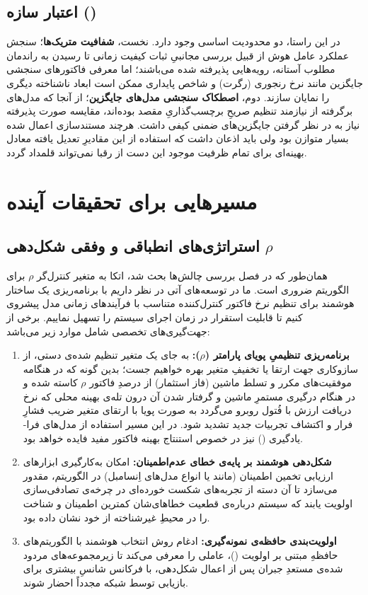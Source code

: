 \documentclass[oneside,openany,phd]{TMU-Thesis}
\begin{document}
\subsection{اعتبار سازه ()}

در این راستا، دو محدودیت اساسی وجود دارد. نخست، \textbf{شفافیت متریک‌ها}؛ سنجش عملکرد عامل هوش از قبیل بررسی مجانبیِ ثبات کیفیت زمانی تا رسیدن به راندمان مطلوب آستانه، رویه‌هایی پذیرفته شده می‌باشند؛ اما معرفی فاکتورهای سنجشی جایگزین مانند نرخ رنجوری (رگرت) و شاخص پایداری ممکن است ابعاد ناشناخته دیگری را نمایان سازند. دوم، \textbf{اصطکاک سنجشی مدل‌های جایگزین}؛ از آنجا که مدل‌های برگرفته از  نیازمند تنظیم صریحِ برچسب‌گذاریِ مقصد بوده‌اند، مقایسه صورت پذیرفته نیاز به در نظر گرفتن جایگزین‌های ضمنی کیفی داشت. هرچند مستندسازی اعمال شده بسیار متوازن بود ولی باید اذعان داشت که استفاده از این مقادیرِ تعدیل یافته معادل بهینه‌ای برای تمام ظرفیت موجود این دست از رقبا نمی‌تواند قلمداد گردد.

\section{مسیرهایی برای تحقیقات آینده}

\subsection{استراتژی‌های انطباقی و وفقی شکل‌دهی $\rho$}

همان‌طور که در فصل بررسی چالش‌ها بحث شد، اتکا به متغیر کنترل‌گر $\rho$ برای الگوریتم ضروری است. ما در توسعه‌های آتی در نظر داریم با برنامه‌ریزی یک ساختار هوشمند برای تنظیم نرخ فاکتور کنترل‌کننده متناسب با فرآیندهای زمانی مدل پیشروی کنیم تا قابلیت استقرار در زمان اجرای سیستم را تسهیل نماییم. برخی از جهت‌گیری‌های تخصصی شامل موارد زیر می‌باشد:
\begin{enumerate}
  \item \textbf{برنامه‌ریزی تنظیمیِ پویای پارامتر ($\rho$):} به جای یک متغیر تنظیم شده‌ی دستی، از سازوکاری جهت ارتقا یا تخفیفِ متغیر بهره خواهیم جست؛ بدین گونه که در هنگامه موفقیت‌های مکرر و تسلط ماشین (فاز استثمار) از درصدِ فاکتور $\rho$ کاسته شده و در هنگام درگیری مستمرِ ماشین و گرفتار شدن آن درون تله‌ی بهینه محلی که نرخ دریافت ارزش با فُتول روبرو می‌گردد به صورت پویا با ارتقای متغیر ضریب فشارِ فرار و اکتشاف تجربیات جدید تشدید شود. در این مسیر استفاده از مدل‌های فرا-یادگیری () نیز در خصوص استنتاج بهینه فاکتور مفید فایده خواهد بود.
  \item \textbf{شکل‌دهی هوشمند بر پایه‌ی خطای عدم‌اطمینان:} امکان به‌کارگیری ابزارهای ارزیابی تخمین اطمینان (مانند  یا انواع مدل‌های اِنسامبل) در الگوریتم، مقدور می‌سازد تا آن دسته از تجربه‌های شکست خورده‌ای در چرخه‌ی تصادفی‌سازی اولویت یابند که سیستم درباره‌ی قطعیت خطاهای‌شان کمترین اطمینان و شناخت را در محیطِ غیرشناخته از خود نشان داده بود.
  \item \textbf{اولویت‌بندی حافظه‌ی نمونه‌گیری:} ادغام روش انتخاب هوشمند با الگوریتم‌های حافظهِ مبتنی بر اولویت ()، عاملی را معرفی می‌کند تا زیرمجموعه‌های مردود شده‌ی مستعدِ جبران پس از اعمال شکل‌دهی، با فرکانس شانسِ بیشتری برای بازیابی توسط شبکه مجدداً احضار شوند.
\end{enumerate}
\end{document}
